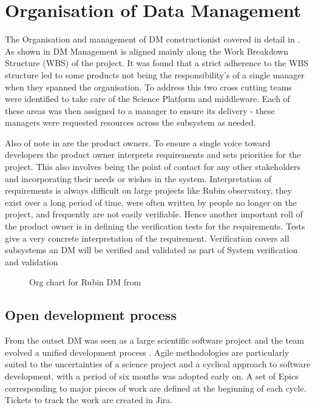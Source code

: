 
\section{Organisation of Data Management} \label{sec:org}

The Organisation and management of DM constructionist covered in detail in \citet{LDM-294}.
As shown in  DM Management is aligned mainly along the Work Breakdown Structure (WBS) of the project.
It was found that a strict adherence to the WBS structure led to some products not being the responsibility's of a single manager when they spanned the organisation.
To address this two cross cutting teams were identified  to take care of the Science Platform and middleware.
Each of these areas was then assigned to a manager to ensure its delivery - these managers were requested resources across the subsystem as needed.

Also of note in  are the product owners.
To ensure a single voice toward developers the product owner interprets requirements and sets priorities for the
project.
This also involves being the point of contact for any other stakeholders and incorporating their needs or wishes in the system.
Interpretation of requirements is always difficult on large projects like Rubin observatory, they exist over a long period of time, were often written by people no longer on the project, and frequently are not easily verifiable.
Hence another important roll of the product owner is in defining the verification tests for the requirements.
Tests give a very concrete interpretation of the requirement.
Verification covers all subsystems an DM will be verified and validated as part of System verification and validation \citep{2014SPIE.9150E..0NS}



\begin{figure}
\caption{Org chart for Rubin DM from \citet{LDM-294}\label{fig:org}}
\end{figure}

\subsection{Open development process}\label{sec:devproc}

From the outset DM was seen as a large scientific software project and the team evolved a unified development process \citep{2018SPIE10707E..09J}.
Agile methodologies \citep{it:agile}  are particularly suited to the uncertainties of a science project and
a cyclical approach to software development, with a period of six months was adopted early on.
A set of Epics corresponding to major pieces of work are defined at the beginning of each cycle.
Tickets to track the work are created in Jira.


